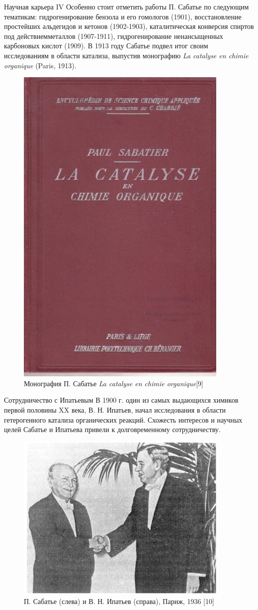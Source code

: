 \documentclass[hyperref={pdfpagelabel=false},usepdftitle=false,xcolor=dvipsnames]{beamer}
\begin{document}
\begin{frame}{Научная карьера IV}
		Особенно стоит отметить работы П. Сабатье по следующим тематикам: гидрогенирование бензола и его гомологов (1901), восстановление простейших альдегидов и кетонов (1902-1903), каталитическая конверсия спиртов под действиемметаллов (1907-1911), гидрогенирование ненансыщенных карбоновых кислот (1909). В 1913 году Сабатье подвел итог своим исследованиям в области катализа, выпустив монографию \textit{La catalyse en chimie organique} (Paris, 1913).
\begin{figure}
	\includegraphics[width=0.2\linewidth]{pictures/book.jpg}
	\caption{Монография П. Сабатье \textit{La catalyse en chimie organique}[9]}
\end{figure}
\end{frame}

\begin{frame}{Сотрудничество с Ипатьевым}
	В 1900 г. один из самых выдающихся химиков первой половины XX века, В. Н. Ипатьев, начал исследования в области гетерогенного катализа органических реакций. Схожесть интересов и научных целей Сабатье и Ипатьева привели к долговременному сотрудничеству. 
	\begin{figure}
		\includegraphics[width = 0.5\linewidth]{pictures/ipatiev.png}
		\caption{П. Сабатье (слева) и В. Н. Ипатьев (справа), Париж, 1936 [10]}
	\end{figure}
\end{frame}
\end{document}
